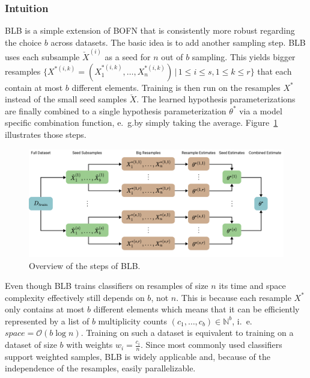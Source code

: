 \subsubsection{Intuition}%
\label{sec:params:blb:intuition}

BLB is a simple extension of BOFN that is consistently more robust regarding the choice \(b\) across datasets.
The basic idea is to add another sampling step.
BLB uses each subsample \(\check{X}^{(i)}\) as a seed for \(n\) out of \(b\) sampling.
This yields bigger resamples \(\{X^{*(i, k)} = (X_1^{*(i, k)}, \dots, X_n^{*(i, k)})\, |\, 1 \leq i \leq s, 1 \leq k \leq r\}\) that each contain at most \(b\) different elements.
Training is then run on the resamples \(X^*\) instead of the small seed samples \(\check{X}\).
The learned hypothesis parameterizations are finally combined to a single hypothesis parameterization \(\theta^*\) via a model specific combination function, e.~g.\@ by simply taking the average.
Figure~\ref{fig:blb:overview} illustrates those steps.
\begin{figure}
	\centering
	\includegraphics[width=\linewidth]{gfx/blb/overview.pdf}
	\caption{Overview of the steps of BLB.}\label{fig:blb:overview}
\end{figure}

Even though BLB trains classifiers on resamples of size \(n\) its time and space complexity effectively still depends on \(b\), not \(n\).
This is because each resample \(X^*\) only contains at most \(b\) different elements which means that it can be efficiently represented by a list of \(b\) multiplicity counts \((c_1, \dots, c_b) \in \mathbb{N}^b\), i.~e.\@ \(\mathit{space} = \mathcal{O}(b \log n)\).
Training on such a dataset is equivalent to training on a dataset of size \(b\) with weights \(w_i = \frac{c_i}{n}\).
Since most commonly used classifiers support weighted samples, BLB is widely applicable and, because of the independence of the resamples, easily parallelizable.

